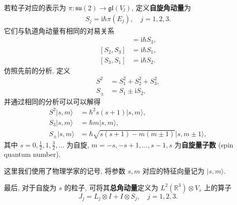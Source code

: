 若粒子对应的表示为 $ \pi:\mathfrak{su}(2)\to\mathfrak{gl}(V_l) $, 定义{\bf 自旋角动量}为
\begin{align*}
    S_j = \mathrm{i}\hbar\pi(E_j),\quad j=1,2,3.
\end{align*}
它们与轨道角动量有相同的对易关系
\begin{align*}
    [S_1,S_2] &= \mathrm{i}\hbar S_3,\\ 
    [S_2,S_3] &= \mathrm{i}\hbar S_1,\\ 
    [S_3,S_1] &= \mathrm{i}\hbar S_2.
\end{align*}
仿照先前的分析, 定义
\begin{align*}
    S^2&=S_1^2+S_2^2+S_3^2,\\ 
    S_{\pm}&=S_1\pm\mathrm{i}S_2,
\end{align*}
并通过相同的分析可以可以解得
\begin{align*}
    S^2|s,m\rangle&=\hbar^2s(s+1)|s,m\rangle,\\
    S_3|s,m\rangle&=\hbar m|s,m\rangle,\\ 
    S_{\pm}|s,m\rangle&=\hbar\sqrt{s(s+1)-m(m\pm 1)}|s,m\pm 1\rangle,
\end{align*}
其中 $ s=0,\frac{1}{2},1,\frac{3}{2},\dots $ 为自旋, $ m=-s,-s+1,\dots,s-1,s $ 为{\bf 自旋量子数} (spin quantum number). 
\begin{remark}
    这里我们使用了物理学家的记号, 将参数 $ s,m $ 对应的特征向量记为 $ |s,m\rangle $.
\end{remark}

最后, 对于自旋为 $ s $ 的粒子, 可将其{\bf 总角动量}定义为 $ L^2(\mathbb{R}^3)\otimes V_s $ 上的算子
\[ J_j=L_j\otimes I+I\otimes S_j,\quad j=1,2,3. \]

